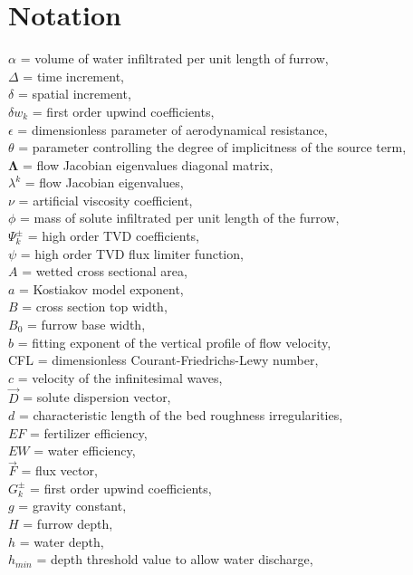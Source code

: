 \documentclass[review,authoryear]{elsarticle}
\begin{document}
\section*{Notation}
\noindent
$\alpha$ = volume of water infiltrated per unit length of furrow,\\
$\Delta$ = time increment,\\
$\delta$ = spatial increment,\\
$\delta w_k$ = first order upwind coefficients,\\
$\epsilon$ = dimensionless parameter of aerodynamical resistance,\\
$\theta$ = parameter controlling the degree of implicitness of
the source term,\\
$\mathbf{\Lambda}$ = flow Jacobian eigenvalues diagonal matrix,\\
$\lambda^k$ = flow Jacobian eigenvalues,\\
$\nu$ = artificial viscosity coefficient,\\
$\phi$ = mass of solute infiltrated per unit length of the furrow,\\
$\Psi_k^\pm$ = high order TVD coefficients,\\
$\psi$ = high order TVD flux limiter function,\\
$A$ = wetted cross sectional area,\\
$a$ = Kostiakov model exponent,\\
$B$ = cross section top width,\\
$B_0$ = furrow base width,\\
$b$ = fitting exponent of the vertical profile of flow velocity,\\
CFL = dimensionless Courant-Friedrichs-Lewy number,\\
$c$ = velocity of the infinitesimal waves,\\
$\vec{D}$ = solute dispersion vector,\\
$d$ = characteristic length of the bed roughness irregularities,\\
$EF$ = fertilizer efficiency,\\
$EW$ = water efficiency,\\
$\vec{F}$ = flux vector,\\
$G_k^\pm$ = first order upwind coefficients,\\
$g$ = gravity constant,\\
$H$ = furrow depth,\\
$h$ = water depth,\\
$h_{min}$ = depth threshold value to allow water discharge,\\ 
\end{document}
